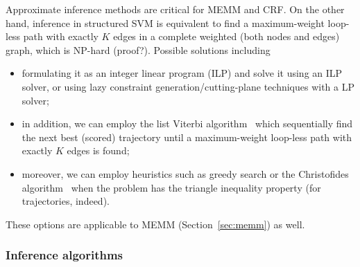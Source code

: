 Approximate inference methods are critical for MEMM and CRF.
On the other hand, inference in structured SVM is equivalent to 
find a maximum-weight loop-less path with exactly $K$ edges in a complete weighted (both nodes and edges) graph, which is NP-hard (proof?).
Possible solutions including 
\begin{itemize}
\item formulating it as an integer linear program (ILP) and solve it using an ILP solver, 
      or using lazy constraint generation/cutting-plane techniques with a LP solver;
\item in addition, we can employ the list Viterbi algorithm~\cite{nilsson2001sequentially,seshadri1994list} 
      which sequentially find the next best (scored) trajectory until a maximum-weight loop-less path with exactly $K$ edges is found;
\item moreover, we can employ heuristics such as greedy search or the Christofides algorithm~\cite{christofides1976} 
      when the problem has the triangle inequality property (for trajectories, indeed).
\end{itemize}
These options are applicable to MEMM (Section~\ref{sec:memm}) as well.



\subsubsection{Inference algorithms}
\label{sec:inference}

